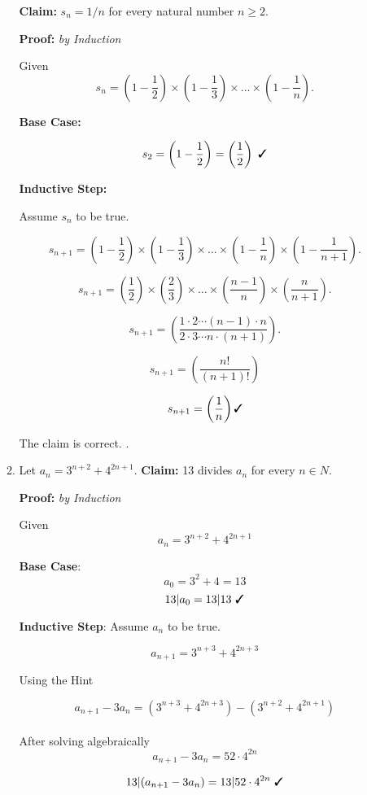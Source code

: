 \documentclass[11pt]{article}
\newcommand{\cmark}{\ding{51}}%
\begin{document}
\begin{enumerate}
\begin{enumerate}
			\textbf{Claim:} $s_n = 1/n$ for every natural number $n\ge 2$.
			
			\textbf{Proof:}  \textit{by Induction}
			
			Given \[ s_n = \left(1 - \frac{1}{2}\right) \times \left(1 - \frac{1}{3}\right) \times \dots
			\times \left(1 - \frac{1}{n}\right). \]
			
			\textbf{Base Case:} 
						
			\[ s_2 =  \left(1 - \frac{1}{2}\right) = \left(\frac{1}{2}\right) \text{ \cmark}\]
				
			\textbf{Inductive Step:}
			
			Assume $s_n$ to be true. 
			
			\[ s_{n+1} = \left(1 - \frac{1}{2}\right) \times \left(1 - \frac{1}{3}\right) \times \dots
			\times \left(1 - \frac{1}{n}\right) \times \left(1 - \frac{1}{n+1}\right). \]
			
			\[ s_{n+1} = \left(\frac{1}{2}\right) \times \left(\frac{2}{3}\right) \times \dots
			\times \left(\frac{n - 1}{n}\right) \times \left(\frac{n}{n+1}\right). \]
			
			\[ s_{n+1} = \left(\frac{1 \cdot 2 \cdots (n-1) \cdot n}{2 \cdot 3 \cdots n \cdot (n+1)}\right). \]			
			
			\[ s_{n+1} = \left(\frac{n!}{(n+1)!}\right)  
			\]
			
			\[ s_{n+1} = \left(\frac{1}{n} \right) \text{\cmark}
			\]
			
			The claim is correct. \cmark.
			
			\item
			Let $a_n = 3^{n+2} + 4^{2n+1}$.
			\textbf{Claim:} 13 divides $a_n$ for every $n \in N$.
			
			\textbf{Proof:} \textit{by Induction}
			
			Given $$a_n = 3^{n+2} + 4^{2n+1}$$
			
			\textbf{Base Case}:
			$$a_0 = 3^{2} + 4 = 13$$
			$$13 \vert a_0 = 13 \vert 13 \text{ \cmark}$$
			
			\textbf{Inductive Step}:
			Assume $a_n$ to be true. 
			
			$$a_{n+1} = 3^{n+3} + 4^{2n+3}$$
			
			Using the Hint
			
			$$a_{n+1} - 3a_{n} = (3^{n+3} + 4^{2n+3}) - (3^{n+2} + 4^{2n+1})$$
			\\ After solving algebraically 
			$$a_{n+1} - 3a_{n} = 52 \cdot 4^{2n}$$			
			
			$$13 \vert (a_{n+1} - 3a_{n}) = 13 \vert 52 \cdot 4^{2n} \text{ \cmark}$$
			

\end{enumerate}
\end{enumerate}
\end{document}
